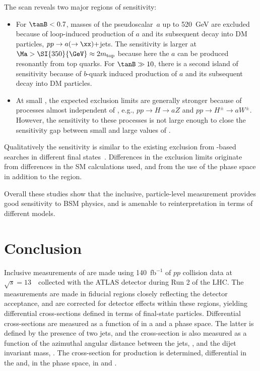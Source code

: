\documentclass[atlasdraft=false, cernpreprint, UKenglish, texmf, orcidlogo]{atlasdoc}
\begin{document}
The scan reveals two major regions of sensitivity:
\begin{itemize}
\item
For $\tanB<0.7$, masses of the pseudoscalar~$a$ up to \SI{520}{\GeV} are excluded because of loop-induced production of $a$
and its subsequent decay into DM particles, $pp\to a(\to\xx)+$jets.
The sensitivity is larger at $\Ma>\SI{350}{\GeV}\approx2m_\mathrm{top}$ because here the $a$ can be produced resonantly from top quarks.
For $\tanB\gg10$, there is a second island of sensitivity because of $b$-quark induced production of $a$ and its subsequent decay into DM particles.
\item
At small \Ma, the expected exclusion limits are generally stronger because of processes almost independent of \tanB, e.g., $pp\to H\to aZ$ and $pp\to H^\pm\to aW^\pm$.
However, the sensitivity to these processes is not large enough to close the sensitivity gap between small and large values of \tanB.
\end{itemize}
Qualitatively the sensitivity is similar to the existing exclusion from \ptmiss-based searches in different final states~\cite{ATLAS:2023rvb}.
Differences in the exclusion limits originate from differences in the SM calculations used, and from the use of the
\vbf phase space in addition to the \onejet region.
 
Overall these studies show that the inclusive, particle-level measurement provides good sensitivity to BSM physics, and is amenable
to reinterpretation in terms of different models.
 
\FloatBarrier
 
 
 


 

\section{Conclusion}
\label{sec:conclusion}
 
Inclusive measurements of \ptmiss are made using 140~fb$^{-1}$ of $pp$ collision data at $\sqrt{s} = 13$~\TeV\ collected with the ATLAS detector during Run 2 of the LHC\@. The measurements
are made in fiducial regions closely reflecting the detector acceptance, and are corrected for detector effects
within these regions, yielding differential cross-sections defined in terms of final-state particles.
Differential cross-sections are measured as a function of \ptmiss in a \onejet and a \vbf phase space.
The latter is defined by the presence of two jets, and the cross-section is also measured as a function of the azimuthal
angular distance between the jets, \dphijj, and the dijet invariant mass, \mjj.
The cross-section for \Znunu production is determined, differential in the \ptmiss and, in the \vbf
phase space, in \dphijj and \mjj.
 
\end{document}
